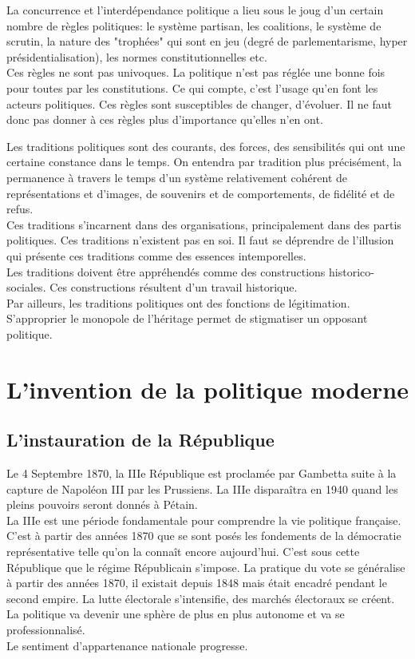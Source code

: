 \documentclass[10pt, a4paper, openany]{book}
\begin{document}
La concurrence et l'interdépendance politique a lieu sous le joug d'un certain nombre de règles politiques: le système partisan, les coalitions, le système de scrutin, la nature des "trophées" qui sont en jeu (degré de parlementarisme, hyper présidentialisation), les normes constitutionnelles etc. \\
Ces règles ne sont pas univoques. La politique n'est pas réglée une bonne fois pour toutes par les constitutions. Ce qui compte, c'est l'usage qu'en font les acteurs politiques. Ces règles sont susceptibles de changer, d'évoluer. Il ne faut donc pas donner à ces règles plus d'importance qu'elles n'en ont.


Les traditions politiques sont des courants, des forces, des sensibilités qui ont une certaine constance dans le temps. On entendra par tradition plus précisément, la permanence à travers le temps d'un système relativement cohérent de représentations et d'images, de souvenirs et de comportements, de fidélité et de refus. \\
Ces traditions s'incarnent dans des organisations, principalement dans des partis politiques. Ces traditions n'existent pas en soi. Il faut se déprendre de l'illusion qui présente ces traditions comme des essences intemporelles. \\
Les traditions doivent être appréhendés comme des constructions historico-sociales. Ces constructions résultent d'un travail historique. \\
Par ailleurs, les traditions politiques ont des fonctions de légitimation. S'approprier le monopole de l'héritage permet de stigmatiser un opposant politique. 


\chapter{L'invention de la politique moderne}

\section{L'instauration de la République}

Le 4 Septembre 1870, la IIIe République est proclamée par Gambetta suite à la capture de Napoléon III par les Prussiens. La IIIe disparaîtra en 1940 quand les pleins pouvoirs seront donnés à Pétain. \\
La IIIe est une période fondamentale pour comprendre la vie politique française. C'est à partir des années 1870 que se sont posés les fondements de la démocratie représentative telle qu'on la connaît encore aujourd'hui. C'est sous cette République que le régime Républicain s'impose. La pratique du vote se généralise à partir des années 1870, il existait depuis 1848 mais était encadré pendant le second empire. La lutte électorale s'intensifie, des marchés électoraux se créent. La politique va devenir une sphère de plus en plus autonome et va se professionnalisé. \\
Le sentiment d'appartenance nationale progresse.
\end{document}
